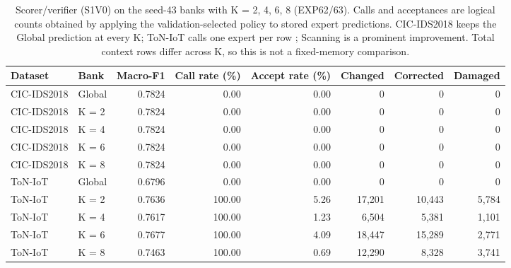 \begin{table}[H]
\centering
\small
\caption{Scorer/verifier (S1V0) on the seed-43 banks with K = 2, 4, 6, 8 (EXP62/63). Calls and acceptances are logical counts obtained by applying the validation-selected policy to stored expert predictions. CIC-IDS2018 keeps the Global prediction at every K; ToN-IoT calls one expert per row ; Scanning is a prominent improvement. Total context rows differ across K, so this is not a fixed-memory comparison.}
\label{tab:sv_by_k}
\begin{tabular}{llrrrrrr}
\toprule
Dataset & Bank & Macro-F1 & Call rate (\%) & Accept rate (\%) & Changed & Corrected & Damaged \\
\midrule
CIC-IDS2018 & Global & 0.7824 & 0.00 & 0.00 & 0 & 0 & 0 \\
CIC-IDS2018 & K = 2 & 0.7824 & 0.00 & 0.00 & 0 & 0 & 0 \\
CIC-IDS2018 & K = 4 & 0.7824 & 0.00 & 0.00 & 0 & 0 & 0 \\
CIC-IDS2018 & K = 6 & 0.7824 & 0.00 & 0.00 & 0 & 0 & 0 \\
CIC-IDS2018 & K = 8 & 0.7824 & 0.00 & 0.00 & 0 & 0 & 0 \\
ToN-IoT & Global & 0.6796 & 0.00 & 0.00 & 0 & 0 & 0 \\
ToN-IoT & K = 2 & 0.7636 & 100.00 & 5.26 & 17,201 & 10,443 & 5,784 \\
ToN-IoT & K = 4 & 0.7617 & 100.00 & 1.23 & 6,504 & 5,381 & 1,101 \\
ToN-IoT & K = 6 & 0.7677 & 100.00 & 4.09 & 18,447 & 15,289 & 2,771 \\
ToN-IoT & K = 8 & 0.7463 & 100.00 & 0.69 & 12,290 & 8,328 & 3,741 \\
\bottomrule
\end{tabular}
\end{table}
